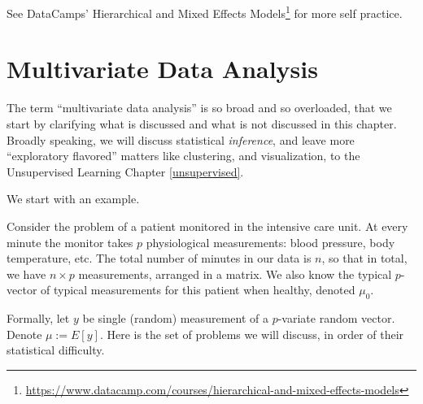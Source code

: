 \documentclass[]{book}
\renewcommand{\href}[2]{#2\footnote{\url{#1}}}
\theoremstyle{definition}
\theoremstyle{definition}
\theoremstyle{definition}
\theoremstyle{remark}
\let\BeginKnitrBlock\begin \let\EndKnitrBlock\end
\begin{document}
See DataCamps' \href{https://www.datacamp.com/courses/hierarchical-and-mixed-effects-models}{Hierarchical and Mixed Effects Models} for more self practice.

\hypertarget{multivariate}{%
\chapter{Multivariate Data Analysis}\label{multivariate}}

The term ``multivariate data analysis'' is so broad and so overloaded, that we start by clarifying what is discussed and what is not discussed in this chapter.
Broadly speaking, we will discuss statistical \emph{inference}, and leave more ``exploratory flavored'' matters like clustering, and visualization, to the Unsupervised Learning Chapter \ref{unsupervised}.

We start with an example.

\BeginKnitrBlock{example}
\protect\hypertarget{exm:icu}{}{\label{exm:icu} }Consider the problem of a patient monitored in the intensive care unit.
At every minute the monitor takes \(p\) physiological measurements: blood pressure, body temperature, etc.
The total number of minutes in our data is \(n\), so that in total, we have \(n \times p\) measurements, arranged in a matrix.
We also know the typical \(p\)-vector of typical measurements for this patient when healthy, denoted \(\mu_0\).
\EndKnitrBlock{example}

Formally, let \(y\) be single (random) measurement of a \(p\)-variate random vector.
Denote \(\mu:=E[y]\).
Here is the set of problems we will discuss, in order of their statistical difficulty.
\end{document}
